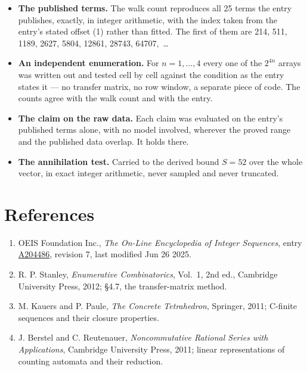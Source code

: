 \documentclass[11pt]{article}
\theoremstyle{definition}
\begin{document}
\begin{itemize}

\item {\bfseries The published terms.} The walk count reproduces all 25 terms the entry publishes, exactly, in integer arithmetic, with the index taken from the entry's stated offset (1) rather than fitted. The first of them are 214, 511, 1189, 2627, 5804, 12861, 28743, 64707,~\dots

\item {\bfseries An independent enumeration.} For $n = 1,\dots,4$ every one of the $2^{4n}$ arrays was written out and tested cell by cell against the condition as the entry states it --- no transfer matrix, no row window, a separate piece of code. The counts agree with the walk count and with the entry.

\item {\bfseries The claim on the raw data.} Each claim was evaluated on the entry's published terms alone, with no model involved, wherever the proved range and the published data overlap. It holds there.

\item {\bfseries The annihilation test.} Carried to the derived bound $S = 52$ over the whole vector, in exact integer arithmetic, never sampled and never truncated.

\end{itemize}

\section{References}

\begin{enumerate}

\item OEIS Foundation Inc., \emph{The On-Line Encyclopedia of Integer Sequences}, entry \href{https://oeis.org/A204486}{A204486}, revision 7, last modified Jun 26 2025.

\item R. P. Stanley, \emph{Enumerative Combinatorics}, Vol.~1, 2nd ed., Cambridge University Press, 2012; \S4.7, the transfer-matrix method.

\item M. Kauers and P. Paule, \emph{The Concrete Tetrahedron}, Springer, 2011; C-finite sequences and their closure properties.

\item J. Berstel and C. Reutenauer, \emph{Noncommutative Rational Series with Applications}, Cambridge University Press, 2011; linear representations of counting automata and their reduction.

\end{enumerate}
\end{document}

